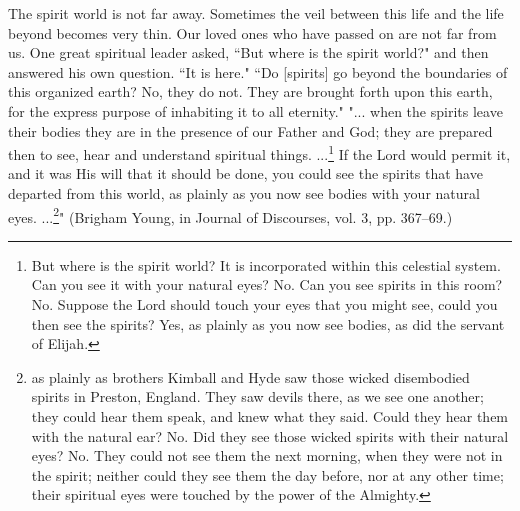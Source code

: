 The spirit world is not far away. Sometimes the veil between this life and the life beyond becomes very thin. Our loved ones who have passed on are not far from us. One great spiritual leader asked, ``But where is the spirit world?" and then answered his own question. ``It is here." ``Do [spirits] go beyond the boundaries of this organized earth? No, they do not. They are brought forth upon this earth, for the express purpose of inhabiting it to all eternity." "... when the spirits leave their bodies they are in the presence of our Father and God; they are prepared then to see, hear and understand spiritual things. ...\footnote{But where is the spirit world? It is incorporated within this celestial system. Can you see it with your natural eyes? No. Can you see spirits in this room? No. Suppose the Lord should touch your eyes that you might see, could you then see the spirits? Yes, as plainly as you now see bodies, as did the servant of Elijah.} If the Lord would permit it, and it was His will that it should be done, you could see the spirits that have departed from this world, as plainly as you now see bodies with your natural eyes. ...\footnote{as plainly as brothers Kimball and Hyde saw those wicked disembodied spirits in Preston, England. They saw devils there, as we see one another; they could hear them speak, and knew what they said. Could they hear them with the natural ear? No. Did they see those wicked spirits with their natural eyes? No. They could not see them the next morning, when they were not in the spirit; neither could they see them the day before, nor at any other time; their spiritual eyes were touched by the power of the Almighty.}" (Brigham Young, in Journal of Discourses, vol. 3, pp. 367–69.)